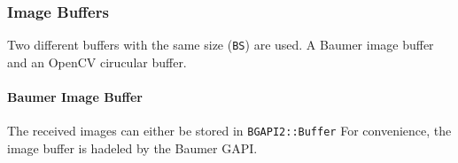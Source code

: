\subsubsection{Image Buffers}
\label{subsubsec:buffers}

Two different buffers with the same size (\texttt{BS}) are used.
A Baumer image buffer and an OpenCV cirucular buffer.


\paragraph{Baumer Image Buffer}
The received images can either be stored in \texttt{BGAPI2::Buffer}
For convenience, the image buffer is hadeled by the Baumer GAPI.




